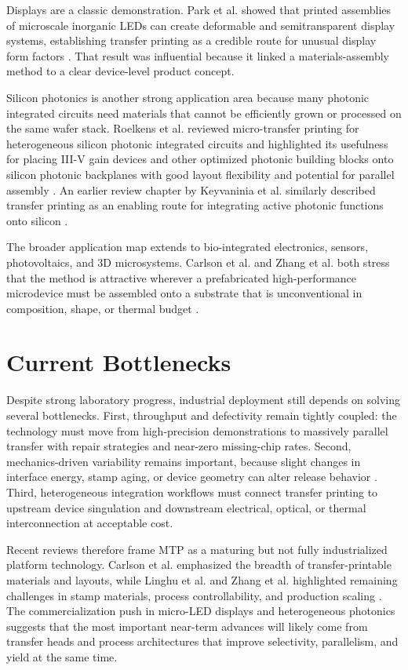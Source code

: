 \documentclass[11pt,a4paper]{article}
\begin{document}
Displays are a classic demonstration. Park et al. showed that printed assemblies of microscale inorganic LEDs can create deformable and semitransparent display systems, establishing transfer printing as a credible route for unusual display form factors \cite{park2009}. That result was influential because it linked a materials-assembly method to a clear device-level product concept.

Silicon photonics is another strong application area because many photonic integrated circuits need materials that cannot be efficiently grown or processed on the same wafer stack. Roelkens et al. reviewed micro-transfer printing for heterogeneous silicon photonic integrated circuits and highlighted its usefulness for placing III-V gain devices and other optimized photonic building blocks onto silicon photonic backplanes with good layout flexibility and potential for parallel assembly \cite{roelkens2022}. An earlier review chapter by Keyvaninia et al. similarly described transfer printing as an enabling route for integrating active photonic functions onto silicon \cite{keyvaninia2018}.

The broader application map extends to bio-integrated electronics, sensors, photovoltaics, and 3D microsystems. Carlson et al. and Zhang et al. both stress that the method is attractive wherever a prefabricated high-performance microdevice must be assembled onto a substrate that is unconventional in composition, shape, or thermal budget \cite{carlson2012, zhang2021}.

\section{Current Bottlenecks}
Despite strong laboratory progress, industrial deployment still depends on solving several bottlenecks. First, throughput and defectivity remain tightly coupled: the technology must move from high-precision demonstrations to massively parallel transfer with repair strategies and near-zero missing-chip rates. Second, mechanics-driven variability remains important, because slight changes in interface energy, stamp aging, or device geometry can alter release behavior \cite{kimlee2014}. Third, heterogeneous integration workflows must connect transfer printing to upstream device singulation and downstream electrical, optical, or thermal interconnection at acceptable cost.

Recent reviews therefore frame MTP as a maturing but not fully industrialized platform technology. Carlson et al. emphasized the breadth of transfer-printable materials and layouts, while Linghu et al. and Zhang et al. highlighted remaining challenges in stamp materials, process controllability, and production scaling \cite{carlson2012, linghu2018, zhang2021}. The commercialization push in micro-LED displays and heterogeneous photonics suggests that the most important near-term advances will likely come from transfer heads and process architectures that improve selectivity, parallelism, and yield at the same time.
\end{document}
